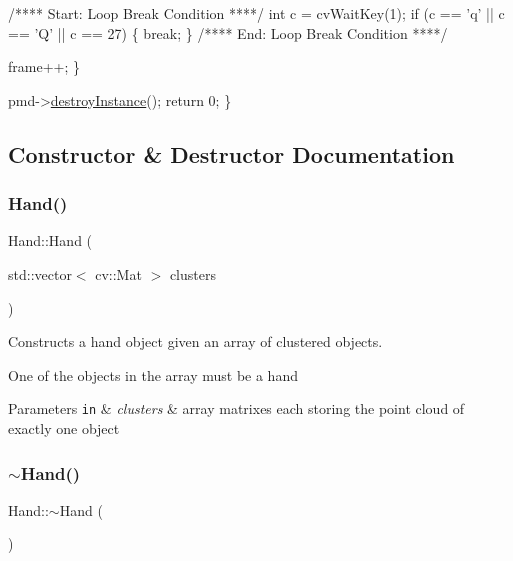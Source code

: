 \begin{DoxyCodeInclude}
        \textcolor{comment}{/**** Start: Loop Break Condition ****/}
        \textcolor{keywordtype}{int} c = cvWaitKey(1);
        \textcolor{keywordflow}{if} (c == \textcolor{charliteral}{'q'} || c == \textcolor{charliteral}{'Q'} || c == 27) \{
            \textcolor{keywordflow}{break};
        \}
        \textcolor{comment}{/**** End: Loop Break Condition ****/}

        frame++;
    \}

    pmd->\hyperlink{class_depth_camera_aaf7c09a863e906f61104f23af10a8597}{destroyInstance}();
    \textcolor{keywordflow}{return} 0;
\}
\end{DoxyCodeInclude}
 

\subsection{Constructor \& Destructor Documentation}
\hypertarget{class_hand_a77bc39dbcb8eee3927dd326b22bd3ae7}{}\label{class_hand_a77bc39dbcb8eee3927dd326b22bd3ae7} 
\subsubsection{\texorpdfstring{Hand()}{Hand()}}
{\footnotesize\ttfamily Hand\+::\+Hand (\begin{DoxyParamCaption}\item[{std\+::vector$<$ cv\+::\+Mat $>$}]{clusters }\end{DoxyParamCaption})}



Constructs a hand object given an array of clustered objects. 

One of the objects in the array must be a hand 
\begin{DoxyParams}[1]{Parameters}
\mbox{\tt in}  & {\em clusters} & array matrixes each storing the point cloud of exactly one object \\
\hline
\end{DoxyParams}
\hypertarget{class_hand_a7ff29a6f23f98c5e57f44d23a76912be}{}\label{class_hand_a7ff29a6f23f98c5e57f44d23a76912be} 
\subsubsection{\texorpdfstring{$\sim$\+Hand()}{~Hand()}}
{\footnotesize\ttfamily Hand\+::$\sim$\+Hand (\begin{DoxyParamCaption}{ }\end{DoxyParamCaption})}




